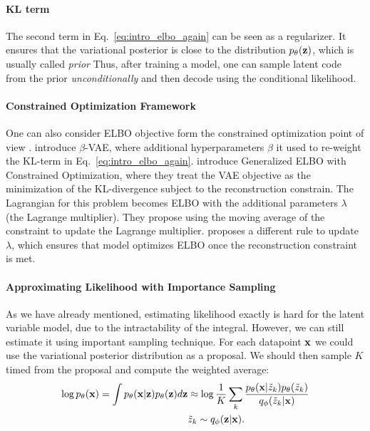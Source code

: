 \paragraph{KL term}
The second term in Eq.~\ref{eq:intro_elbo_again} can be seen as a regularizer. It ensures that the variational posterior is close to the distribution $p_{\theta}({\mathbf{z}})$, which is usually called \textit{prior}
Thus, after training a model, one can sample latent code from the prior \textit{unconditionally} and then decode using the conditional likelihood. 

\paragraph{Constrained Optimization Framework}
One can also consider ELBO objective form the constrained optimization point of view \citep{higgins2017beta, rezende2018taming}. \citet{higgins2017beta} introduce $\beta$-VAE, where additional hyperparameters $\beta$ it used to re-weight the KL-term in Eq.~\ref{eq:intro_elbo_again}. \citet{rezende2018taming} introduce Generalized ELBO with Constrained Optimization, where they treat the VAE objective as the minimization of the KL-divergence subject to the reconstruction constrain. The Lagrangian for this problem becomes ELBO with the additional parameters $\lambda$ (the Lagrange multiplier). They propose using the moving average of the constraint to update the Lagrange multiplier.
\citet{klushyn2019learning} proposes a different rule to update $\lambda$, which ensures that model optimizes ELBO once the reconstruction constraint is met. 

\paragraph{Approximating Likelihood with Importance Sampling}

As we have already mentioned, estimating likelihood exactly is hard for the latent variable model, due to the intractability of the integral. However, we can still estimate it using important sampling technique. For each datapoint ${\mathbf{x}}$ we could use the variational posterior distribution as a proposal. We should then sample $K$ timed from the proposal and compute the weighted average:
\begin{equation}
\begin{aligned}
    \log p_{\theta}({\mathbf{x}}) = \int p_{\theta}({\mathbf{x}}|{\mathbf{z}})p_{\theta}({\mathbf{z}})d{\mathbf{z}} &\approx \log \frac1K \sum_k\frac{p_{\theta}({\mathbf{x}}|\tilde{z}_k)p_{\theta}(\tilde{z}_k)}{q_{\phi}(\tilde{z}_k|{\mathbf{x}})}\\
    &\tilde{z}_k \sim q_{\phi}({\mathbf{z}}|{\mathbf{x}}).
\end{aligned}
\end{equation}


